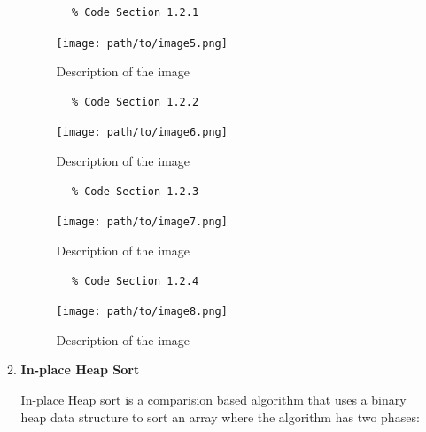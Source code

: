 \documentclass{article}
\begin{document}
\begin{enumerate}
\begin{enumerate}[label*=\arabic*.]
        \begin{verbatim}
        % Code Section 1.2.1
        \end{verbatim}

        \begin{figure}[h]
            \centering
            \texttt{[image: path/to/image5.png]}
            \caption{Description of the image}
            \label{fig:image5}
        \end{figure}

        \begin{verbatim}
        % Code Section 1.2.2
        \end{verbatim}

        \begin{figure}[h]
            \centering
            \texttt{[image: path/to/image6.png]}
            \caption{Description of the image}
            \label{fig:image6}
        \end{figure}

        \begin{verbatim}
        % Code Section 1.2.3
        \end{verbatim}

        \begin{figure}[h]
            \centering
            \texttt{[image: path/to/image7.png]}
            \caption{Description of the image}
            \label{fig:image7}
        \end{figure}

        \begin{verbatim}
        % Code Section 1.2.4
        \end{verbatim}

        \begin{figure}[h]
            \centering
            \texttt{[image: path/to/image8.png]}
            \caption{Description of the image}
            \label{fig:image8}
        \end{figure}

      \item \textbf{In-place Heap Sort}

          In-place Heap sort is a comparision based algorithm that uses a binary heap data structure to sort an array where the algorithm has two phases:


\end{enumerate}
\end{enumerate}
\end{document}
